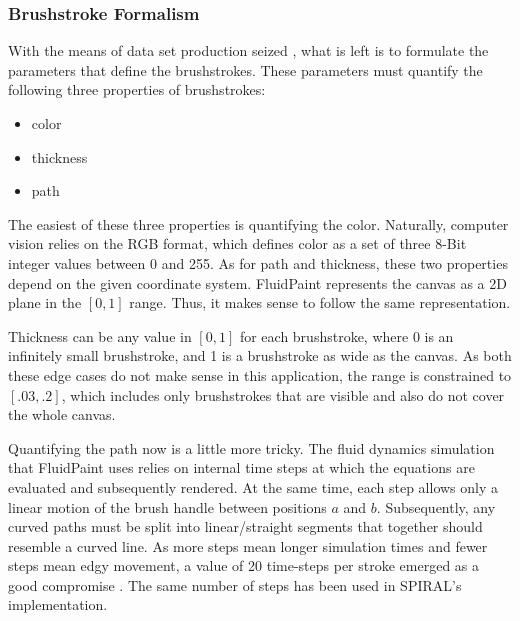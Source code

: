 

\subsubsection{Brushstroke Formalism}
With the means of data set production seized , what is left is to formulate the parameters that define the brushstrokes.
These parameters must quantify the following three properties of brushstrokes:
\begin{itemize}
    \item color
    \item thickness
    \item path
\end{itemize}

The easiest of these three properties is quantifying the color.
Naturally, computer vision relies on the RGB format, which defines color as a set of three 8-Bit integer values between 0 and 255. 
As for path and thickness, these two properties depend on the given coordinate system.
FluidPaint represents the canvas as a 2D plane in the $[0, 1]$ range.
Thus, it makes sense to follow the same representation.

Thickness can be any value in $[0, 1]$  for each brushstroke, where 0 is an infinitely small brushstroke, and 1 is a brushstroke as wide as the canvas.
As both these edge cases do not make sense in this application, the range is constrained to $[.03, .2]$, which includes only brushstrokes that are visible and also do not cover the whole canvas.

Quantifying the path now is a little more tricky.
The fluid dynamics simulation that FluidPaint uses relies on internal time steps at which the equations are evaluated and subsequently rendered.
At the same time, each step allows only a linear motion of the brush handle between positions $a$ and $b$.
Subsequently, any curved paths must be split into linear/straight segments that together should resemble a curved line.
As more steps mean longer simulation times and fewer steps mean edgy movement, a value of 20 time-steps per stroke emerged as a good compromise .
The same number of steps has been used in SPIRAL's implementation.

